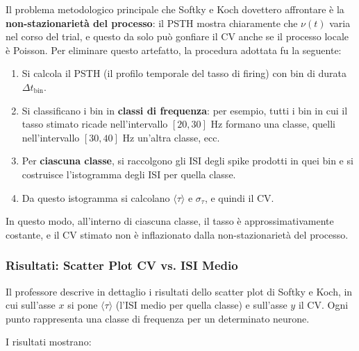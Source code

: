 Il problema metodologico principale che Softky e Koch dovettero affrontare è la \textbf{non-stazionarietà del processo}: il PSTH mostra chiaramente che $\nu(t)$ varia nel corso del trial, e questo da solo può gonfiare il CV anche se il processo locale è Poisson. Per eliminare questo artefatto, la procedura adottata fu la seguente:

\begin{enumerate}
    \item Si calcola il PSTH (il profilo temporale del tasso di firing) con bin di durata $\Delta t_{\text{bin}}$.
    \item Si classificano i bin in \textbf{classi di frequenza}: per esempio, tutti i bin in cui il tasso stimato ricade nell'intervallo $[20, 30]$ Hz formano una classe, quelli nell'intervallo $[30, 40]$ Hz un'altra classe, ecc.
    \item Per \textbf{ciascuna classe}, si raccolgono gli ISI degli spike prodotti in quei bin e si costruisce l'istogramma degli ISI per quella classe.
    \item Da questo istogramma si calcolano $\langle \tau \rangle$ e $\sigma_\tau$, e quindi il CV.
\end{enumerate}

In questo modo, all'interno di ciascuna classe, il tasso è approssimativamente costante, e il CV stimato non è inflazionato dalla non-stazionarietà del processo.

\subsubsection{Risultati: Scatter Plot CV vs. ISI Medio}

Il professore descrive in dettaglio i risultati dello scatter plot di Softky e Koch, in cui sull'asse $x$ si pone $\langle \tau \rangle$ (l'ISI medio per quella classe) e sull'asse $y$ il CV. Ogni punto rappresenta una classe di frequenza per un determinato neurone.

I risultati mostrano:

